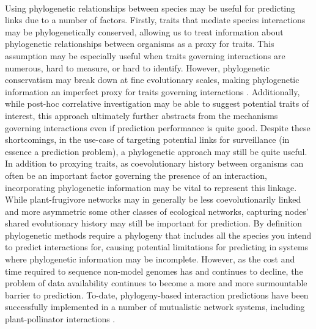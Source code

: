 \paragraph*{}
Using phylogenetic relationships between species may be useful for predicting links due to a number of factors. Firstly, traits that mediate species interactions may be phylogenetically conserved, allowing us to treat information about phylogenetic relationships between organisms as a proxy for traits. This assumption may be especially useful when traits governing interactions are numerous, hard to measure, or hard to identify. However, phylogenetic conservatism may break down at fine evolutionary scales, making phylogenetic information an imperfect proxy for traits governing interactions \cite{rafferty2013}. Additionally, while post-hoc correlative investigation may be able to suggest potential traits of interest, this approach ultimately further abstracts from the mechanisms governing interactions even if prediction performance is quite good. Despite these shortcomings, in the use-case of targeting potential links for surveillance (in essence a prediction problem), a phylogenetic approach may still be quite useful. In addition to proxying traits, as coevolutionary history between organisms can often be an important factor governing the presence of an interaction, incorporating phylogenetic information may be vital to represent this linkage. While plant-frugivore networks may in generally be less coevolutionarily linked and more asymmetric some other classes of ecological networks\cite{maglianesi2024phylogenetic, jordano1987patterns, wheelwright1982seed}, capturing nodes' shared evolutionary history may still be important for prediction. By definition phylogenetic methods require a phylogeny that includes all the species you intend to predict interactions for, causing potential limitations for predicting in systems where phylogenetic information may be incomplete. However, as the cost and time required to sequence non-model genomes has and continues to decline, the problem of data availability continues to become a more and more surmountable barrier to prediction. To-date, phylogeny-based interaction predictions have been successfully implemented in a number of mutualistic network systems, including plant-pollinator interactions \cite{Braga21}.



